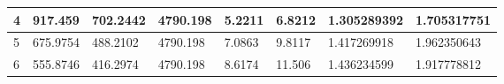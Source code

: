 \begin{table}[]
{\begin{tabular}{|l|l|l|l|l|l|l|l|}
4                                                                                     & 917.459                                                                                                            & 702.2442                                                                                                               & 4790.198                                                                                                                           & 5.2211                                                                                               & 6.8212                                                                                                 & 1.305289392                                                                                          & 1.705317751                                                                                            \\ \hline
5                                                                                     & 675.9754                                                                                                           & 488.2102                                                                                                               & 4790.198                                                                                                                           & 7.0863                                                                                               & 9.8117                                                                                                 & 1.417269918                                                                                          & 1.962350643                                                                                            \\ \hline
6                                                                                     & 555.8746                                                                                                           & 416.2974                                                                                                               & 4790.198                                                                                                                           & 8.6174                                                                                               & 11.506                                                                                                 & 1.436234599                                                                                          & 1.917778812                                                                                            \\ \hline
\end{tabular}}
\end{table}


